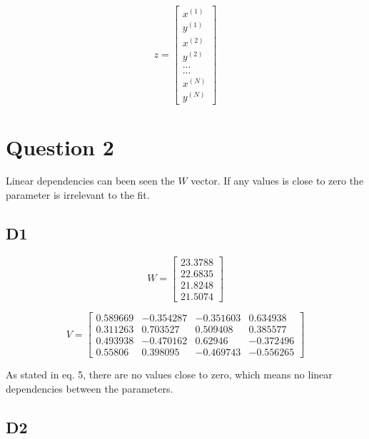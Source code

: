 \begin{equation}
z=\begin{bmatrix} { x }^{ \left( 1 \right)  } \\ y^{ \left( 1 \right)  } \\ { x }^{ \left( 2 \right)  } \\ { y }^{ \left( 2 \right)  } \\ ... \\ ... \\ { x }^{ \left( N \right)  } \\ { y }^{ \left( N \right)  } \end{bmatrix}
\label{eq:} 
\end{equation}

\section*{Question 2}
Linear dependencies can been seen the $W$ vector. If any values is close to zero the parameter is irrelevant to the fit. 
\subsection*{D1}

\begin{equation}
W=\begin{bmatrix} 23.3788 \\ 22.6835 \\ 21.8248 \\ 21.5074  \end{bmatrix}
\label{eq:} 
\end{equation}

\begin{equation}
V=\begin{bmatrix}  0.589669 & -0.354287 & -0.351603 & 0.634938 \\
0.311263 & 0.703527 & 0.509408 & 0.385577 \\
0.493938 & -0.470162 & 0.62946 & -0.372496 \\
0.55806 & 0.398095 & -0.469743 & -0.556265  \end{bmatrix}
\label{eq:} 
\end{equation}

As stated in eq. 5, there are no values close to zero, which means no linear dependencies between the parameters.

\subsection*{D2}

